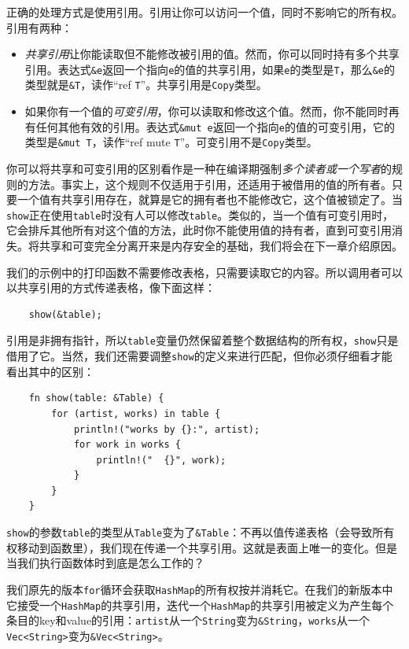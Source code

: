 正确的处理方式是使用引用。引用让你可以访问一个值，同时不影响它的所有权。引用有两种：
\begin{itemize}
    \item \emph{共享引用}让你能读取但不能修改被引用的值。然而，你可以同时持有多个共享引用。表达式\texttt{\&e}返回一个指向\texttt{e}的值的共享引用，如果\texttt{e}的类型是\texttt{T}，那么\texttt{\&e}的类型就是\texttt{\&T}，读作“ref \texttt{T}”。共享引用是\texttt{Copy}类型。
    \item 如果你有一个值的\emph{可变引用}，你可以读取和修改这个值。然而，你不能同时再有任何其他有效的引用。表达式\texttt{\&mut e}返回一个指向\texttt{e}的值的可变引用，它的类型是\texttt{\&mut T}，读作“ref mute \texttt{T}”。可变引用不是\texttt{Copy}类型。
\end{itemize}

你可以将共享和可变引用的区别看作是一种在编译期强制\emph{多个读者或一个写者}的规则的方法。事实上，这个规则不仅适用于引用，还适用于被借用的值的所有者。只要一个值有共享引用存在，就算是它的拥有者也不能修改它，这个值被锁定了。当\texttt{show}正在使用\texttt{table}时没有人可以修改\texttt{table}。类似的，当一个值有可变引用时，它会排斥其他所有对这个值的方法，此时你不能使用值的持有者，直到可变引用消失。将共享和可变完全分离开来是内存安全的基础，我们将会在下一章介绍原因。

我们的示例中的打印函数不需要修改表格，只需要读取它的内容。所以调用者可以以共享引用的方式传递表格，像下面这样：
\begin{verbatim}
    show(&table);
\end{verbatim}

引用是非拥有指针，所以\texttt{table}变量仍然保留着整个数据结构的所有权，\texttt{show}只是借用了它。当然，我们还需要调整\texttt{show}的定义来进行匹配，但你必须仔细看才能看出其中的区别：

\begin{verbatim}
    fn show(table: &Table) {
        for (artist, works) in table {
            println!("works by {}:", artist);
            for work in works {
                println!("  {}", work);
            }
        }
    }
\end{verbatim}

\texttt{show}的参数\texttt{table}的类型从\texttt{Table}变为了\texttt{\&Table}：不再以值传递表格（会导致所有权移动到函数里），我们现在传递一个共享引用。这就是表面上唯一的变化。但是当我们执行函数体时到底是怎么工作的？

我们原先的版本\texttt{for}循环会获取\texttt{HashMap}的所有权按并消耗它。在我们的新版本中它接受一个\texttt{HashMap}的共享引用，迭代一个\texttt{HashMap}的共享引用被定义为产生每个条目的key和value的引用：\texttt{artist}从一个\texttt{String}变为\texttt{\&String}，\texttt{works}从一个\texttt{Vec<String>}变为\texttt{\&Vec<String>}。

